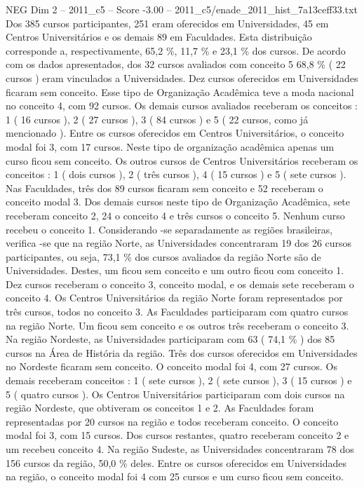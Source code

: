\begin{textsample}{NEG Dim 2 – 2011\_c5 – Score -3.00 – 2011\_c5/enade\_2011\_hist\_7a13ceff33.txt}
Dos 385 cursos participantes, 251 eram oferecidos em Universidades, 45 em Centros Universitários e os demais 89 em Faculdades.
Esta distribuição corresponde a, respectivamente, 65,2 \%, 11,7 \% e 23,1 \% dos cursos.
De acordo com os dados apresentados, dos 32 cursos avaliados com conceito 5 68,8 \% ( 22 cursos ) eram vinculados a Universidades.
Dez cursos oferecidos em Universidades ficaram sem conceito.
Esse tipo de Organização Acadêmica teve a moda nacional no conceito 4, com 92 cursos.
Os demais cursos avaliados receberam os conceitos : 1 ( 16 cursos ), 2 ( 27 cursos ), 3 ( 84 cursos ) e 5 ( 22 cursos, como já mencionado ).
Entre os cursos oferecidos em Centros Universitários, o conceito modal foi 3, com 17 cursos.
Neste tipo de organização acadêmica apenas um curso ficou sem conceito.
Os outros cursos de Centros Universitários receberam os conceitos : 1 ( dois cursos ), 2 ( três cursos ), 4 ( 15 cursos ) e 5 ( sete cursos ).
Nas Faculdades, três dos 89 cursos ficaram sem conceito e 52 receberam o conceito modal 3.
Dos demais cursos neste tipo de Organização Acadêmica, sete receberam conceito 2, 24 o conceito 4 e três cursos o conceito 5.
Nenhum curso recebeu o conceito 1.
Considerando -se separadamente as regiões brasileiras, verifica -se que na região Norte, as Universidades concentraram 19 dos 26 cursos participantes, ou seja, 73,1 \% dos cursos avaliados da região Norte são de Universidades.
Destes, um ficou sem conceito e um outro ficou com conceito 1.
Dez cursos receberam o conceito 3, conceito modal, e os demais sete receberam o conceito 4.
Os Centros Universitários da região Norte foram representados por três cursos, todos no conceito 3.
As Faculdades participaram com quatro cursos na região Norte.
Um ficou sem conceito e os outros três receberam o conceito 3.
Na região Nordeste, as Universidades participaram com 63 ( 74,1 \% ) dos 85 cursos na Área de História da região.
Três dos cursos oferecidos em Universidades no Nordeste ficaram sem conceito.
O conceito modal foi 4, com 27 cursos.
Os demais receberam conceitos : 1 ( sete cursos ), 2 ( sete cursos ), 3 ( 15 cursos ) e 5 ( quatro cursos ).
Os Centros Universitários participaram com dois cursos na região Nordeste, que obtiveram os conceitos 1 e 2.
As Faculdades foram representadas por 20 cursos na região e todos receberam conceito.
O conceito modal foi 3, com 15 cursos.
Dos cursos restantes, quatro receberam conceito 2 e um recebeu conceito 4.
Na região Sudeste, as Universidades concentraram 78 dos 156 cursos da região, 50,0 \% deles.
Entre os cursos oferecidos em Universidades na região, o conceito modal foi 4 com 25 cursos e um curso ficou sem conceito.

\end{textsample}
